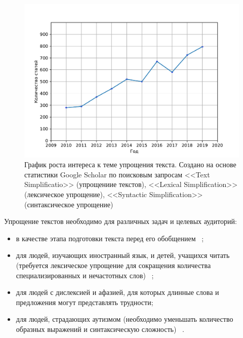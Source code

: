 
\begin{figure}[h!]
	\begin{center}
		\includegraphics[pages=-, scale=0.9]{./inc/img/graph.pdf}
		\caption{График роста интереса к теме упрощения текста. Создано на основе статистики Google Scholar по поисковым запросам <<Text Simplificatio>> (упрощениие текстов),  <<Lexical Simplification>> (лексическое упрощение), <<Syntactic Simplification>> (синтаксическое упрощение)\cite{sikka_survey_2020}}  
		\label{fig:growth_of_interest}
	\end{center}
\end{figure}

	
	
	
	

Упрощение текстов необходимо для различных задач и целевых аудиторий: 
\begin{itemize}
	\item в качестве этапа подготовки текста перед его обобщением ~\cite{finegan_dollak_sentence_2016}; 
	\item для людей, изучающих иностранный язык, и детей, учащихся читать (требуется лексическое упрощение для сокращения количества специализированных и нечастотных слов) ~\cite{liu_simplification_2016};
	\item для людей с дислексией и афазией, для которых длинные слова и предложения могут представлять трудности;
	\item для людей, страдающих аутизмом (необходимо уменьшать количество образных выражений и синтаксическую сложность) ~\cite{evans_evaluation_2014}.
\end{itemize}

